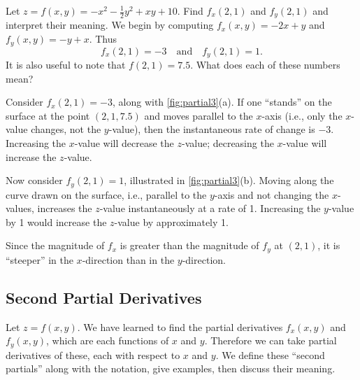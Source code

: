 \begin{example}\label{ex_partial3}
Let $z=f(x,y)=-x^2-\frac12y^2+xy+10$. Find $f_x(2,1)$ and $f_y(2,1)$ and interpret their meaning.
\solution
We begin by computing $f_x(x,y) = -2x+y$ and $f_y(x,y) = -y+x$. Thus
\[f_x(2,1) = -3 \quad \text{and}\quad f_y(2,1) = 1.\]
It is also useful to note that $f(2,1) = 7.5$. What does each of these numbers mean?


Consider $f_x(2,1)=-3$, along with \autoref{fig:partial3}(a). If one ``stands'' on the surface at the point $(2,1,7.5)$ and moves parallel to the $x$-axis (i.e., only the $x$-value changes, not the $y$-value), then the instantaneous rate of change is $-3$. Increasing the $x$-value will decrease the $z$-value; decreasing the $x$-value will increase the $z$-value.

Now consider $f_y(2,1)=1$, illustrated in \autoref{fig:partial3}(b). Moving along the curve drawn on the surface, i.e., parallel to the $y$-axis and not changing the $x$-values, increases the $z$-value instantaneously at a rate of 1. Increasing the $y$-value by 1 would increase the $z$-value by approximately 1.

Since the magnitude of $f_x$ is greater than the magnitude of $f_y$ at $(2,1)$, it is ``steeper'' in the $x$-direction than in the $y$-direction.
\end{example}


\subsection{Second Partial Derivatives}

Let $z=f(x,y)$. We have learned to find the partial derivatives $f_x(x,y)$ and $f_y(x,y)$, which are each functions of $x$ and $y$. Therefore we can take partial derivatives of these, each with respect to $x$ and $y$. We define these ``second partials'' along with the notation, give examples, then discuss their meaning.

